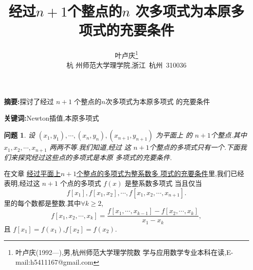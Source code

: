 \documentclass[twoside,11pt]{article}
\newtheorem{question}{问题}
\begin{document}
\title{\huge{\bf{经过$n+1$个整点的$n$ 次多项式为本原多项式的充要条件}}}
\author{\small{叶卢庆\footnote{叶卢庆(1992---),男,杭州师范大学理学院数
      学与应用数学专业本科在读,E-mail:h5411167@gmail.com}}\\{\small{杭
      州师范大学理学院,浙江~杭州~310036}}} \date{}
\maketitle



\textbf{\small{摘要}:}探讨了经过 $n+1$ 个整点的$n$次多项式为本原多项式
的充要条件 \smallskip

\textbf{\small{关键词}:}Newton插值,本原多项式\smallskip


\vspace{30pt} %

\begin{question}
  设 $(x_1,y_1),\cdots,(x_n,y_{n}),(x_{n+1},y_{n+1})$ 为平面上
  的 $n+1$个整点.其中 $x_1,x_2,\cdots,x_{n+1}$ 两两不等.我们知道,经过
  这 $n+1$个整点的多项式只有一个.下面我们来探究经过这些点的多项式是本原
  多项式的充要条件.
\end{question}
\bigskip
在文章
\href{https://github.com/Ye-luqing/polynomials/blob/master/%E7%BB%8F%E8%BF%87%E5%B9%B3%E9%9D%A2%E4%B8%8An%2B1%E4%B8%AA%E6%95%B4%E7%82%B9%E7%9A%84%E5%A4%9A%E9%A1%B9%E5%BC%8F%E4%B8%BA%E6%95%B4%E7%B3%BB%E6%95%B0%E5%A4%9A%E9%A1%B9%E5%BC%8F%E7%9A%84%E5%85%85%E8%A6%81%E6%9D%A1%E4%BB%B6.tex}{
                                经过平面上$n+1$个整点的多项式为整系数多
                                项式的充要条件}里,我们已经表明,经过这
                              $n+1$ 个点的多项式 $f(x)$ 是整系数多项式
                              当且仅当
$$
f[x_1],f[x_1,x_2],\cdots,f[x_1,x_2,\cdots,x_{n+1}].
$$
里的每个数都是整数.其中$\forall k\geq 2$,
$$f[x_1,x_2,\cdots,x_k]=\frac{f[x_1,\cdots,x_{k-1}]-f[x_2,\cdots,x_k]}{x_1-x_k},$$
且 $f[x_1]=f(x_1)$,$f[x_2]=f(x_2)$.

  \begin{thebibliography}{}
  \end{thebibliography}
\end{document}
